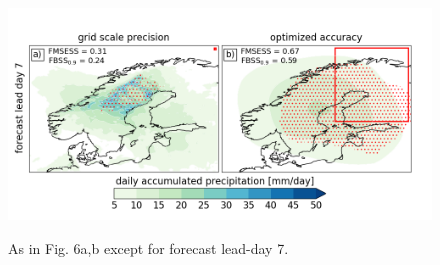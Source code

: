 \documentclass[preprint,12pt,authoryear]{elsarticle}
\begin{document}
\newpage
\begin{figure}[t]
  \noindent\includegraphics[scale=0.6]{fig_S5.png}\\
  \caption{As in Fig. 6a,b except for forecast lead-day 7.} \label{f5}
\end{figure}





% 
%







\end{document}
